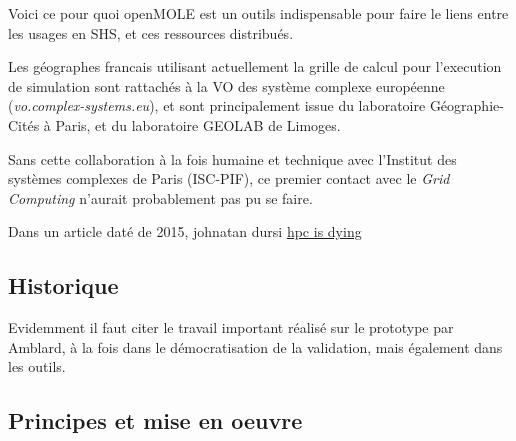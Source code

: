

Voici ce pour quoi openMOLE est un outils indispensable pour faire le liens entre les usages en SHS, et ces ressources distribués.

Les géographes francais utilisant actuellement la grille de calcul pour l'execution de simulation sont rattachés à la VO des système complexe européenne (\textit{vo.complex-systems.eu}), et sont principalement issue du laboratoire Géographie-Cités à Paris, et du laboratoire GEOLAB de Limoges.

Sans cette collaboration à la fois humaine et technique avec l'Institut des systèmes complexes de Paris (ISC-PIF), ce premier contact avec le \textit{Grid Computing} n'aurait probablement pas pu se faire.


Dans un article daté de 2015, johnatan dursi
\href{http://www.dursi.ca/hpc-is-dying-and-mpi-is-killing-it/}{hpc is dying}

\subsection{Historique}

Evidemment il faut citer le travail important réalisé sur le prototype par Amblard, à la fois dans le démocratisation de la validation, mais également dans les outils.

\subsection{Principes et mise en oeuvre}

